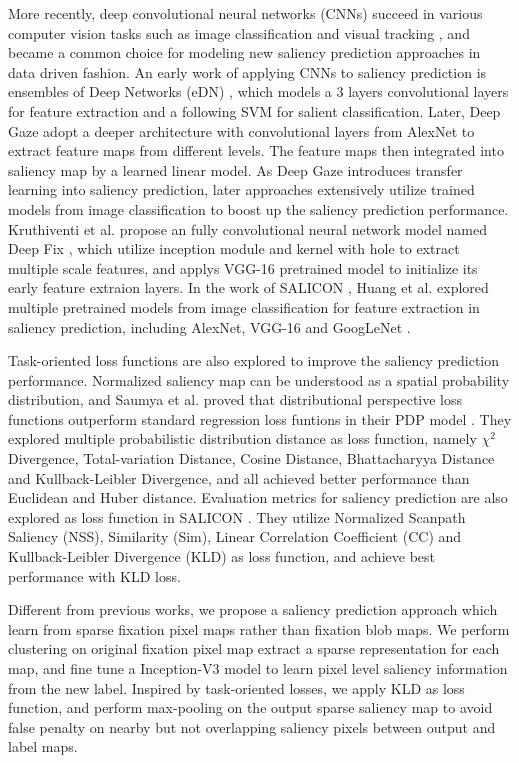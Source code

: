 \documentclass[letterpaper, 10 pt, conference]{ieeeconf}  %
\begin{document}
\par More recently, deep convolutional neural networks (CNNs) succeed in various computer vision tasks such as image classification \cite{b11,b12} and visual tracking \cite{b13,b14}, and became a common choice for modeling new saliency prediction approaches in data driven fashion. An early work of applying CNNs to saliency prediction is ensembles of Deep Networks (eDN) \cite{b15}, which models a 3 layers convolutional layers for feature extraction and a following SVM for salient classification. Later, Deep Gaze \cite{b16} adopt a deeper architecture with convolutional layers from AlexNet \cite{b17} to extract feature maps from different levels. The feature maps then integrated into saliency map by a learned linear model. As Deep Gaze introduces transfer learning into saliency prediction, later approaches extensively utilize trained models from image classification to boost up the saliency prediction performance. Kruthiventi et al. propose an fully convolutional neural network model named Deep Fix \cite{b6}, which utilize inception module and kernel with hole to extract multiple scale features, and applys VGG-16 \cite{b11} pretrained model to initialize its early feature extraion layers. In the work of SALICON \cite{b19}, Huang et al. explored multiple pretrained models from image classification for feature extraction in saliency prediction, including AlexNet, VGG-16 and GoogLeNet \cite{b20}.

\par Task-oriented loss functions are also explored to improve the saliency prediction performance. Normalized saliency map can be understood as a spatial probability distribution, and Saumya et al. proved that distributional perspective loss functions outperform standard regression loss funtions in their PDP model \cite{b21}. They explored multiple probabilistic distribution distance as loss function, namely $\chi^{2}$ Divergence, Total-variation Distance, Cosine Distance, Bhattacharyya Distance and Kullback-Leibler Divergence, and all achieved better performance than Euclidean and Huber distance. Evaluation metrics for saliency prediction are also explored as loss function in SALICON \cite{b7}. They utilize Normalized Scanpath Saliency (NSS), Similarity (Sim), Linear Correlation Coefficient (CC) and Kullback-Leibler Divergence (KLD) as loss function, and achieve best performance with KLD loss.

\par Different from previous works, we propose a saliency prediction approach which learn from sparse fixation pixel maps rather than fixation blob maps. We perform clustering on original fixation pixel map extract a sparse representation for each map, and fine tune a Inception-V3 model \cite{b22} to learn pixel level saliency information from the new label. Inspired by task-oriented losses, we apply KLD as loss function, and perform max-pooling on the output sparse saliency map to avoid false penalty on nearby but not overlapping saliency pixels between output and label maps.
\end{document}
